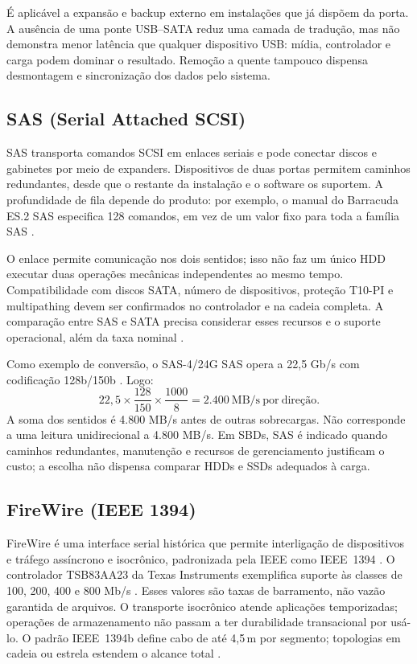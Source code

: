 \documentclass[titlepage]{article}
\begin{document}
É aplicável a expansão e backup externo em instalações que já dispõem da porta. A ausência de uma ponte USB--SATA reduz uma camada de tradução, mas não demonstra menor latência que qualquer dispositivo USB: mídia, controlador e carga podem dominar o resultado. Remoção a quente tampouco dispensa desmontagem e sincronização dos dados pelo sistema.

\subsection{SAS (Serial Attached SCSI)}
SAS transporta comandos SCSI em enlaces seriais e pode conectar discos e gabinetes por meio de expanders. Dispositivos de duas portas permitem caminhos redundantes, desde que o restante da instalação e o software os suportem. A profundidade de fila depende do produto: por exemplo, o manual do Barracuda ES.2 SAS especifica 128 comandos, em vez de um valor fixo para toda a família SAS \cite{seagate_sas}.

O enlace permite comunicação nos dois sentidos; isso não faz um único HDD executar duas operações mecânicas independentes ao mesmo tempo. Compatibilidade com discos SATA, número de dispositivos, proteção T10-PI e multipathing devem ser confirmados no controlador e na cadeia completa. A comparação entre SAS e SATA precisa considerar esses recursos e o suporte operacional, além da taxa nominal \cite{microchip_storage,seagate_sas}.

Como exemplo de conversão, o SAS-4/24G SAS opera a 22,5 Gb/s com codificação 128b/150b \cite{microchip_sas4}. Logo:
\[
22{,}5\times\frac{128}{150}\times\frac{1000}{8}
=2.400\ \mathrm{MB/s\ por\ direção}.
\]
A soma dos sentidos é 4.800 MB/s antes de outras sobrecargas. Não corresponde a uma leitura unidirecional a 4.800 MB/s. Em SBDs, SAS é indicado quando caminhos redundantes, manutenção e recursos de gerenciamento justificam o custo; a escolha não dispensa comparar HDDs e SSDs adequados à carga.

\subsection{FireWire (IEEE 1394)}
FireWire é uma interface serial histórica que permite interligação de dispositivos e tráfego assíncrono e isocrônico, padronizada pela IEEE como IEEE~1394 \cite{ieee1394_2008}. O controlador TSB83AA23 da Texas Instruments exemplifica suporte às classes de 100, 200, 400 e 800 Mb/s \cite{ti_firewire}. Esses valores são taxas de barramento, não vazão garantida de arquivos. O transporte isocrônico atende aplicações temporizadas; operações de armazenamento não passam a ter durabilidade transacional por usá-lo. O padrão IEEE~1394b define cabo de até 4,5\,m por segmento; topologias em cadeia ou estrela estendem o alcance total \cite{ieee1394_2008}.
\end{document}
